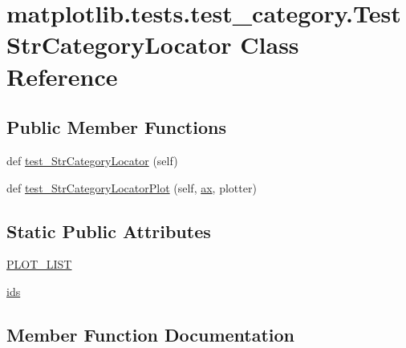 \hypertarget{classmatplotlib_1_1tests_1_1test__category_1_1TestStrCategoryLocator}{}\section{matplotlib.\+tests.\+test\+\_\+category.\+Test\+Str\+Category\+Locator Class Reference}
\label{classmatplotlib_1_1tests_1_1test__category_1_1TestStrCategoryLocator}
\subsection*{Public Member Functions}
\begin{DoxyCompactItemize}
\item 
def \hyperlink{classmatplotlib_1_1tests_1_1test__category_1_1TestStrCategoryLocator_a41e2576f726d1a9cbe8278a9c595946a}{test\+\_\+\+Str\+Category\+Locator} (self)
\item 
def \hyperlink{classmatplotlib_1_1tests_1_1test__category_1_1TestStrCategoryLocator_a179d524ee3948807ce8794a0ccdc5e2e}{test\+\_\+\+Str\+Category\+Locator\+Plot} (self, \hyperlink{namespacematplotlib_1_1tests_1_1test__category_ac4a78c2ee1d8720275b6d0ca5dee3c1c}{ax}, plotter)
\end{DoxyCompactItemize}
\subsection*{Static Public Attributes}
\begin{DoxyCompactItemize}
\item 
\hyperlink{classmatplotlib_1_1tests_1_1test__category_1_1TestStrCategoryLocator_abe74c0b9a3484226f3e0ab8c11a866c5}{P\+L\+O\+T\+\_\+\+L\+I\+ST}
\item 
\hyperlink{classmatplotlib_1_1tests_1_1test__category_1_1TestStrCategoryLocator_ae941e480e00f6f9fb974458e0505de8b}{ids}
\end{DoxyCompactItemize}


\subsection{Member Function Documentation}
\mbox{\label{classmatplotlib_1_1tests_1_1test__category_1_1TestStrCategoryLocator_a41e2576f726d1a9cbe8278a9c595946a}} 
